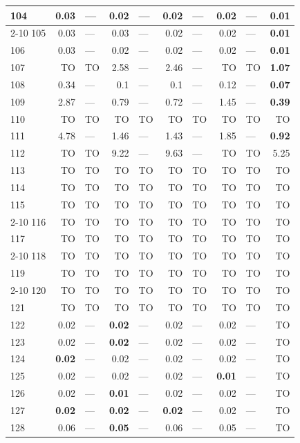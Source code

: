 \begin{longtable}{lr@{\hskip 4pt}l@{\hskip 12pt}r@{\hskip 4pt}l@{\hskip 12pt}r@{\hskip 4pt}l@{\hskip 12pt}r@{\hskip 4pt}l@{\hskip 12pt}r}
104 & 0.03 & --- & 0.02 & --- & 0.02 & --- & 0.02 & --- & \textbf{0.01} \\
\cmidrule{2-10}
105 & 0.03 & --- & 0.03 & --- & 0.02 & --- & 0.02 & --- & \textbf{0.01} \\
106 & 0.03 & --- & 0.02 & --- & 0.02 & --- & 0.02 & --- & \textbf{0.01} \\
\midrule
107 & TO & TO & 2.58 & --- & 2.46 & --- & TO & TO & \textbf{1.07} \\
108 & 0.34 & --- & 0.1 & --- & 0.1 & --- & 0.12 & --- & \textbf{0.07} \\
109 & 2.87 & --- & 0.79 & --- & 0.72 & --- & 1.45 & --- & \textbf{0.39} \\
110 & TO & TO & TO & TO & TO & TO & TO & TO & TO \\
111 & 4.78 & --- & 1.46 & --- & 1.43 & --- & 1.85 & --- & \textbf{0.92} \\
112 & TO & TO & 9.22 & --- & 9.63 & --- & TO & TO & 5.25 \\
113 & TO & TO & TO & TO & TO & TO & TO & TO & TO \\
114 & TO & TO & TO & TO & TO & TO & TO & TO & TO \\
115 & TO & TO & TO & TO & TO & TO & TO & TO & TO \\
\cmidrule{2-10}
116 & TO & TO & TO & TO & TO & TO & TO & TO & TO \\
117 & TO & TO & TO & TO & TO & TO & TO & TO & TO \\
\cmidrule{2-10}
118 & TO & TO & TO & TO & TO & TO & TO & TO & TO \\
119 & TO & TO & TO & TO & TO & TO & TO & TO & TO \\
\cmidrule{2-10}
120 & TO & TO & TO & TO & TO & TO & TO & TO & TO \\
121 & TO & TO & TO & TO & TO & TO & TO & TO & TO \\
\midrule
122 & 0.02 & --- & \textbf{0.02} & --- & 0.02 & --- & 0.02 & --- & TO \\
123 & 0.02 & --- & \textbf{0.02} & --- & 0.02 & --- & 0.02 & --- & TO \\
124 & \textbf{0.02} & --- & 0.02 & --- & 0.02 & --- & 0.02 & --- & TO \\
125 & 0.02 & --- & 0.02 & --- & 0.02 & --- & \textbf{0.01} & --- & TO \\
126 & 0.02 & --- & \textbf{0.01} & --- & 0.02 & --- & 0.02 & --- & TO \\
127 & \textbf{0.02} & --- & \textbf{0.02} & --- & \textbf{0.02} & --- & 0.02 & --- & TO \\
128 & 0.06 & --- & \textbf{0.05} & --- & 0.06 & --- & 0.05 & --- & TO \\

\end{longtable}
